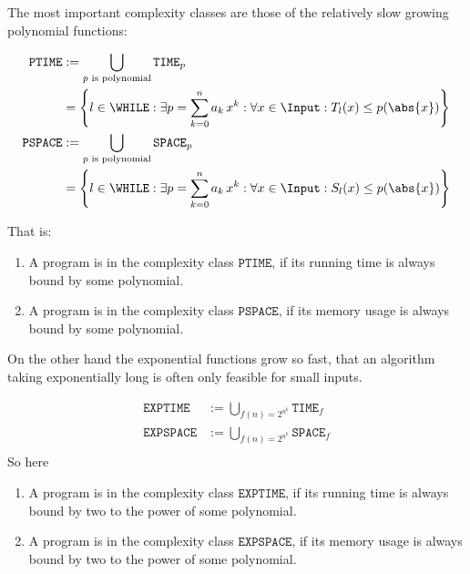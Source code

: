 The most important complexity classes are those of the relatively slow 
growing polynomial functions:

\begin{defn}
	\begin{equation*}
		\begin{split}
			\mathtt{PTIME} &:= \bigcup_{p\text{ is polynomial}}\mathtt{TIME}_p \\
			&= \left\{l\in \WHILE: \exists p=\sum^n_{k=0}a_k\,x^k: \forall x\in \Input: T_l(x)\leq p(\abs{x})\right\}\\
			\mathtt{PSPACE} &:= \bigcup_{p\text{ is polynomial}}\mathtt{SPACE}_p \\
			&= \left\{l\in \WHILE: \exists p=\sum^n_{k=0}a_k\,x^k: \forall x\in \Input: S_l(x)\leq p(\abs{x})\right\} 
		\end{split}
	\end{equation*}

	That is:
	\begin{enumerate}
		\item A program is in the complexity class $\mathtt{PTIME}$, if its running time is always bound 
			by some polynomial.
		\item A program is in the complexity class $\mathtt{PSPACE}$, if its memory usage is always bound 
			by some polynomial.
	\end{enumerate}
\end{defn}

On the other hand the exponential functions grow so fast, that an algorithm 
taking exponentially long is often only feasible for small inputs.

\begin{defn}
	\begin{equation*}
		\begin{split}
			\mathtt{EXPTIME} &:= \bigcup_{f(n)=2^{n^k}} \mathtt{TIME}_{f}\\
			\mathtt{EXPSPACE} &:= \bigcup_{f(n)=2^{n^k}} \mathtt{SPACE}_{f}\\
		\end{split}
	\end{equation*}
	So here
	\begin{enumerate}
		\item A program is in the complexity class $\mathtt{EXPTIME}$, if its running time is always bound 
			by two to the power of some polynomial.
		\item A program is in the complexity class $\mathtt{EXPSPACE}$, if its memory usage is always bound 
			by two to the power of some polynomial.
	\end{enumerate}
\end{defn}
